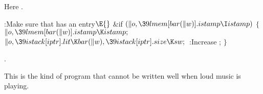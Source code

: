Here .

\Y\B\4:Make sure that  has an  entry\X${}%
\E{}$\6
\&{if} ${}(\|o,\39\\{lmem}[\\{bar}(\|w)].\\{istamp}\I\\{istamp}){}$\5
${}\{{}$\1\6
${}\|o,\39\\{lmem}[\\{bar}(\|w)].\\{istamp}\K\\{istamp};{}$\6
${}\|o,\39\\{istack}[\\{iptr}].\\{lit}\K\\{bar}(\|w),\39\\{istack}[\\{iptr}].%
\\{size}\K\\{sw};{}$\6
:Increase \X;\6
\4${}\}{}$\2\par
{}.\fi

This is the kind of program that cannot be written well
when loud music
is playing.

